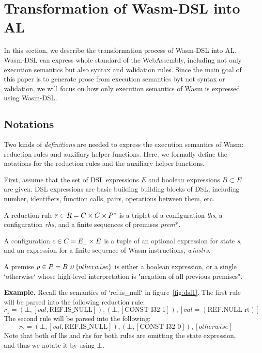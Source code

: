 \section{Transformation of Wasm-DSL into AL}\label{sec:translate}

In this section, we describe the transformation process of Wasm-DSL into AL.
Wasm-DSL can express whole standard of the WebAssembly, including not only
execution semantics but also syntax and validation rules.
Since the main goal of this paper is to generate prose from execution semantics byt not syntax or validation,
we will focus on how only execution semantics of Wasm is expressed using Wasm-DSL.

\subsection{Notations}

Two kinds of \textit{definitions} are needed to express the execution semantics of Wasm:
reduction rules and auxiliary helper functions.
Here, we formally define the notations for the reduction rules and the auxiliary helper functions.

First, assume that the set of DSL expressions $E$ and boolean expressions $B \subset E$ are given.
DSL expressions are basic building building blocks of DSL, including number, identifiers,
function calls, pairs, operations between them, etc. 

A reduction rule $r \in R = C \times C \times P^\ast$ is a triplet of a
configuration \textit{lhs}, a configuration \textit{rhs}, and a finite sequences of premises \textit{prem}*.

A configuration $c \in C = E_\bot \times E$ is a tuple of an optional expression for state \textit{s},
and an expression for a finite sequence of Wasm instructions, \textit{winstrs}.

A premise $p \in P = B \uplus \{otherwise\}$ is either a boolean expression, or a
single `otherwise` whose high-level interpretation is "negation of all previous premises".

\textbf{Example.} Recall the semantics of `ref.is\_null` in figure~\ref{fig:dsl1}.
The first rule will be parsed into the following reduction rule:
\[r_1=(\bot, [val, \text{REF.IS\_NULL}]), (\bot, [\text{CONST I32 1}]), [val = (\text{REF.NULL rt})]\]
The second rule will be parsed into the following:
\[r_2=(\bot, [val, \text{REF.IS\_NULL}]), (\bot, [\text{CONST I32 0}]), [otherwise]\]
Note that both of lhs and rhs for both rules are omitting the state expression,
and thus we notate it by using $\bot$.


